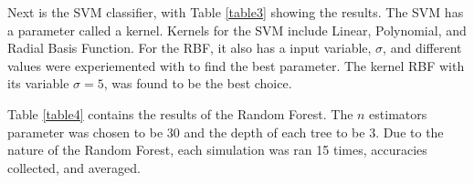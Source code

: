 \documentclass[conference,compsoc]{IEEEtran}
\begin{document}
Next is the SVM classifier, with Table \ref{table3} showing the results. The SVM has a parameter called a kernel. Kernels for the SVM include Linear, Polynomial, and Radial Basis Function.  For the RBF, it also has a input variable,  $\sigma$, and different values were experiemented with to find the best parameter. The kernel RBF with its variable $\sigma=5$, was found to be the best choice.
\begin{table*}
	\caption{Accuracies for SVM Classifier}
	\label{table3}
	\noindent{}

\end{table*}

Table \ref{table4} contains the results of the Random Forest. The $n$ estimators parameter was chosen to be $30$ and the depth of each tree to be $3$. Due to the nature of the Random Forest, each simulation was ran 15 times, accuracies collected, and averaged.
\begin{table*}
	\caption{Accuracies for Random Forest Classifier}
	\label{table4}
	\noindent{}

\end{table*}
\end{document}
